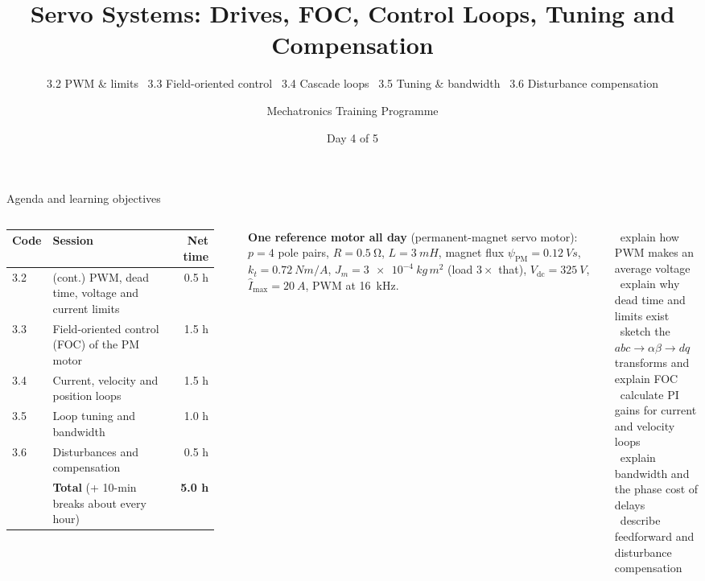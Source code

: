 \documentclass[aspectratio=169,10pt]{beamer}
\title[Day 4 -- Servo Drives, FOC and Control Loops]{Servo Systems: Drives, FOC, Control Loops, Tuning and Compensation}
\subtitle{3.2 PWM \& limits \textbullet\ 3.3 Field-oriented control \textbullet\ 3.4 Cascade loops \textbullet\ 3.5 Tuning \& bandwidth \textbullet\ 3.6 Disturbance compensation}
\author{Mechatronics Training Programme}
\institute{Theoretical Course Series}
\date{Day 4 of 5}
\begin{document}
\begin{frame}[plain]\titlepage\end{frame}

\begin{frame}[t]{Agenda and learning objectives}
\begin{columns}[T,onlytextwidth]
\footnotesize
\begin{tabularx}{\linewidth}{@{}l X r@{}}
\toprule
\textbf{Code} & \textbf{Session} & \textbf{Net time}\\
\midrule
3.2 & (cont.) PWM, dead time, voltage and current limits & 0.5 h\\
3.3 & Field-oriented control (FOC) of the PM motor & 1.5 h\\
3.4 & Current, velocity and position loops & 1.5 h\\
3.5 & Loop tuning and bandwidth & 1.0 h\\
3.6 & Disturbances and compensation & 0.5 h\\
\midrule
 & \textbf{Total} (+ 10-min breaks about every hour) & \textbf{5.0 h}\\
\bottomrule
\end{tabularx}\\[2mm]
\begin{notebox}
\textbf{One reference motor all day} (permanent-magnet servo motor):
$p=4$ pole pairs, $R=\SI{0.5}{\ohm}$, $L=\SI{3}{mH}$, magnet flux $\psi_\text{PM}=\SI{0.12}{Vs}$,
$k_t=\SI{0.72}{Nm/A}$, $J_m=\SI{3e-4}{kg\,m^2}$ (load $3\times$ that),
$V_\text{dc}=\SI{325}{V}$, $\hat I_\text{max}=\SI{20}{A}$, PWM at \SI{16}{kHz}.
\end{notebox}
\begin{keybox}
\small
\checkitem\ explain how PWM makes an average voltage\\
\checkitem\ explain why dead time and limits exist\\
\checkitem\ sketch the $abc\to\alpha\beta\to dq$ transforms and explain FOC\\
\checkitem\ calculate PI gains for current and velocity loops\\
\checkitem\ explain bandwidth and the phase cost of delays\\
\checkitem\ describe feedforward and disturbance compensation
\end{keybox}
\end{columns}
\end{frame}
\end{document}
